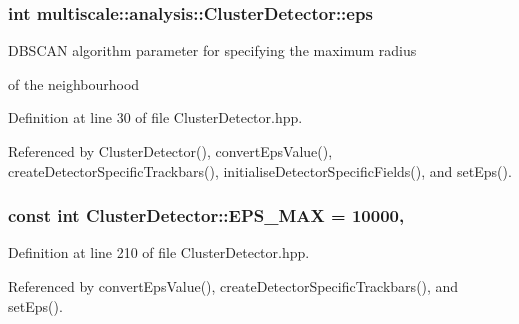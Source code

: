 \hypertarget{classmultiscale_1_1analysis_1_1ClusterDetector_a61e876f87d62245eada8f56d587d39cd}{
\subsubsection[{eps}]{\setlength{\rightskip}{0pt plus 5cm}int multiscale\-::analysis\-::\-Cluster\-Detector\-::eps\hspace{0.3cm}{\ttfamily [protected]}}}\label{classmultiscale_1_1analysis_1_1ClusterDetector_a61e876f87d62245eada8f56d587d39cd}
\begin{DoxyVerb}                        DBSCAN algorithm parameter for specifying the maximum radius
\end{DoxyVerb}
 of the neighbourhood 

Definition at line 30 of file Cluster\-Detector.\-hpp.



Referenced by Cluster\-Detector(), convert\-Eps\-Value(), create\-Detector\-Specific\-Trackbars(), initialise\-Detector\-Specific\-Fields(), and set\-Eps().

\hypertarget{classmultiscale_1_1analysis_1_1ClusterDetector_a76d0b4ecd2793d478317cc1bc856e06f}{
\subsubsection[{E\-P\-S\-\_\-\-M\-A\-X}]{\setlength{\rightskip}{0pt plus 5cm}const int Cluster\-Detector\-::\-E\-P\-S\-\_\-\-M\-A\-X = 10000\hspace{0.3cm}{\ttfamily [static]}, {\ttfamily [private]}}}\label{classmultiscale_1_1analysis_1_1ClusterDetector_a76d0b4ecd2793d478317cc1bc856e06f}


Definition at line 210 of file Cluster\-Detector.\-hpp.



Referenced by convert\-Eps\-Value(), create\-Detector\-Specific\-Trackbars(), and set\-Eps().


